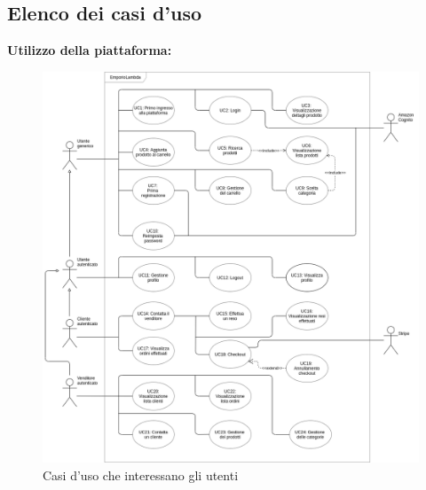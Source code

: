     \subsection{Elenco dei casi d'uso}
        \textbf{Utilizzo della piattaforma:}
        \begin{figure}[!ht]
            \caption{Casi d'uso che interessano gli utenti}
            \vspace{10px}
            \includegraphics[scale=0.44]{../../../Images/AnalisiRequisiti/casiUso}
            \centering
        \end{figure}
        \newpage
        
        
        
        
        
        
        
        
        
        
        
        
        
        
        
        
        
        
        
        
        
        
        
        
        
        
        
        
        
               